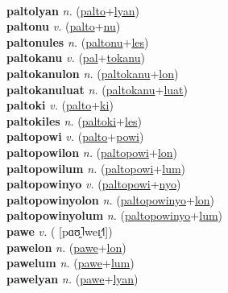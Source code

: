  \label{paltolumiti} \\
\textbf{paltolyan} \textit{n.} (\hyperref[palto]{palto}+\hyperref[lyan]{lyan})
 \label{paltolyan} \\
\textbf{paltonu} \textit{v.} (\hyperref[palto]{palto}+\hyperref[nu]{nu})
 \label{paltonu} \\
\textbf{paltonules} \textit{n.} (\hyperref[paltonu]{paltonu}+\hyperref[les]{les})
 \label{paltonules} \\
\textbf{paltokanu} \textit{v.} (\hyperref[pal]{pal}+\hyperref[tokanu]{tokanu})
 \label{paltokanu} \\
\textbf{paltokanulon} \textit{n.} (\hyperref[paltokanu]{paltokanu}+\hyperref[lon]{lon})
 \label{paltokanulon} \\
\textbf{paltokanuluat} \textit{n.} (\hyperref[paltokanu]{paltokanu}+\hyperref[luat]{luat})
 \label{paltokanuluat} \\
\textbf{paltoki} \textit{v.} (\hyperref[palto]{palto}+\hyperref[ki]{ki})
 \label{paltoki} \\
\textbf{paltokiles} \textit{n.} (\hyperref[paltoki]{paltoki}+\hyperref[les]{les})
 \label{paltokiles} \\
\textbf{paltopowi} \textit{v.} (\hyperref[palto]{palto}+\hyperref[powi]{powi})
 \label{paltopowi} \\
\textbf{paltopowilon} \textit{n.} (\hyperref[paltopowi]{paltopowi}+\hyperref[lon]{lon})
 \label{paltopowilon} \\
\textbf{paltopowilum} \textit{n.} (\hyperref[paltopowi]{paltopowi}+\hyperref[lum]{lum})
 \label{paltopowilum} \\
\textbf{paltopowinyo} \textit{v.} (\hyperref[paltopowi]{paltopowi}+\hyperref[nyo]{nyo})
 \label{paltopowinyo} \\
\textbf{paltopowinyolon} \textit{n.} (\hyperref[paltopowinyo]{paltopowinyo}+\hyperref[lon]{lon})
 \label{paltopowinyolon} \\
\textbf{paltopowinyolum} \textit{n.} (\hyperref[paltopowinyo]{paltopowinyo}+\hyperref[lum]{lum})
 \label{paltopowinyolum} \\
\textbf{pawe} \textit{v.} ( [pɑʊ̯˥weɪ̯˧˥])
 \label{pawe} \\
\textbf{pawelon} \textit{n.} (\hyperref[pawe]{pawe}+\hyperref[lon]{lon})
 \label{pawelon} \\
\textbf{pawelum} \textit{n.} (\hyperref[pawe]{pawe}+\hyperref[lum]{lum})
 \label{pawelum} \\
\textbf{pawelyan} \textit{n.} (\hyperref[pawe]{pawe}+\hyperref[lyan]{lyan})
 \label{pawelyan} \\
